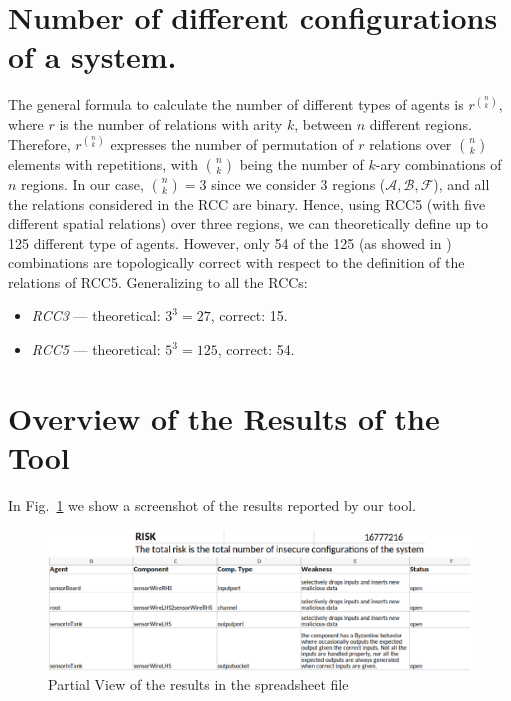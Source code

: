 \documentclass[runningheads]{llncs}
\newcommand{\assertionRegion}{\mathcal{A}}
\newcommand{\beliefRegion}{\mathcal{B}}
\newcommand{\factRegion}{\mathcal{F}}
\begin{document}
\section{Number of different configurations of a system.}\label{app:agcalc}
The general formula to calculate the number of different types of agents is
$r^{\binom{n}{k}}$, where $r$ is the number of relations with arity $k$,
between $n$ different regions. Therefore, $r^{\binom{n}{k}}$
expresses the number of permutation of $r$
relations over ${\binom{n}{k}}$ elements with repetitions, 
with ${\binom{n}{k}}$ being the number of
$k$-ary combinations of $n$ regions.
In our case, $\binom{n}{k}=3$ since we consider $3$ regions 
($\assertionRegion,\beliefRegion,\factRegion$), and all the relations
considered in the RCC are binary.  Hence, using RCC5 (with five different
spatial relations) over three regions, we can theoretically define up to 125
different type of agents. However, only 54 of the 125 (as showed in
\autocite{improvingRCC}) combinations are topologically correct with respect to
the definition of the relations of RCC5. Generalizing to all the RCCs:

\begin{itemize}%
\item \emph{RCC3} --- theoretical: $3^3=27$,  correct: 15.
\item \emph{RCC5} --- theoretical: $5^3=125$, correct: 54.
\end{itemize}

\section{Overview of the Results of the Tool}\label{app:results}
In Fig.~\ref{fig:results} we show a screenshot of the 
results reported by our tool.
\begin{figure}
	\centering
	\includegraphics[width=\textwidth]{results.pdf}
	\caption{Partial View of the results in the spreadsheet file}
	\label{fig:results}
\end{figure}
\end{document}
